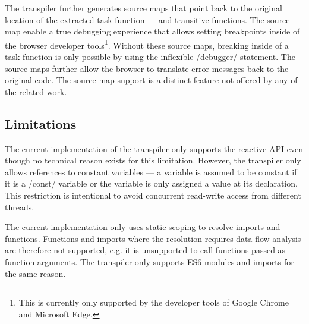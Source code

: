 The transpiler further generates source maps that point back to the original location of the extracted task function --- and transitive functions. The source map enable a true debugging experience that allows setting breakpoints inside of the browser developer tools\footnote{This is currently only supported by the developer tools of Google Chrome and Microsoft Edge.}. Without these source maps, breaking inside of a task function is only possible by using the inflexible \javascriptinline/debugger/ statement. The source maps further allow the browser to translate error messages back to the original code. The source-map support is a distinct feature not offered by any of the related work.

\subsection{Limitations}
The current implementation of the transpiler only supports the reactive API even though no technical reason exists for this limitation. However, the transpiler only allows references to constant variables --- a variable is assumed to be constant if it is a \javascriptinline/const/ variable or the variable is only assigned a value at its declaration. This restriction is intentional to avoid concurrent read-write access from different threads. 

The current implementation only uses static scoping to resolve imports and functions. Functions and imports where the resolution requires data flow analysis are therefore not supported, e.g. it is unsupported to call functions passed as function arguments. The transpiler only supports ES6 modules and imports for the same reason.
